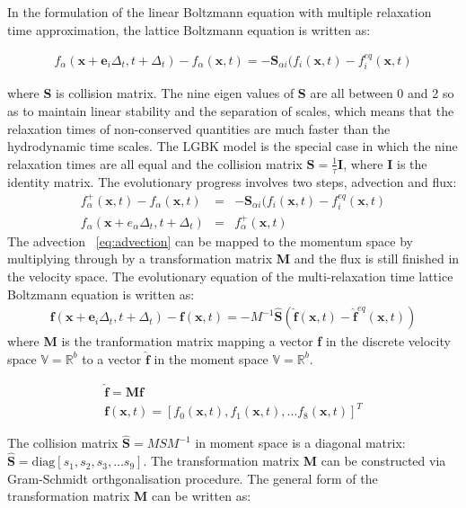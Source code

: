In the formulation of the linear Boltzmann equation with multiple relaxation time approximation, the lattice Boltzmann equation is written as:

\begin{align}
f_{\alpha}(\mathbf{x}+\mathbf{e}_i\Delta_t, t+ \Delta_t)-f_{\alpha}(\mathbf{x},t)=-\mathbf{S}_{\alpha i}(f_i(\mathbf{x},t)-f_i^{eq}(\mathbf{x},t)
\end{align}

\noindent where \textbf{S} is collision matrix. The nine eigen values of \textbf{S} are all between 0 and 2 so as to maintain linear stability and the separation of scales, which means that the relaxation times of non-conserved quantities are much faster than the hydrodynamic time scales. The LGBK model is the special case in which the nine relaxation times are all equal and the collision matrix $\mathbf{S}=\frac{1}{\tau}\mathbf{I}$, where \textbf{I} is the identity matrix. The evolutionary progress involves two steps, advection and flux:
\begin{align}
f_{\alpha}^+(\mathbf{x},t)-f_{\alpha}(\mathbf{x},t) & = & -\mathbf{S}_{\alpha i}(f_i(\mathbf{x},t)-f_i^{eq}(\mathbf{x},t) \label{eq:advection}\\
f_{\alpha}(\mathbf{x}+e_{\alpha}\Delta_t, t+\Delta_t) & = & f_{\alpha}^+(\mathbf{x},t)
\end{align}
\noindent The advection ~\cref{eq:advection} can be mapped to the momentum space by multiplying through by a transformation matrix \textbf{M} and the flux is still finished in the velocity space. The evolutionary equation of the multi-relaxation time lattice Boltzmann equation is written as:
\begin{align}
\mathbf{f}(\mathbf{x}+\mathbf{e}_i\Delta_t, t+ \Delta_t)-\mathbf{f}(\mathbf{x},t)=-M^{-1}\hat{\mathbf{S}}(\hat{\mathbf{f}}(\mathbf{x},t)-\hat{\mathbf{f}}^{eq}(\mathbf{x},t))
\end{align}
\noindent where \textbf{M} is the tranformation matrix mapping a vector \textbf{f} in the discrete velocity space $\mathds{V}=\mathds{R}^b$ to a vector $\hat{\mathbf{f}}$ in the moment space $\mathds{V}=\mathds{R}^b$. 

\begin{align}
\nonumber
\hat{\mathbf{f}}= \mathbf{M}\mathbf{f} \\ 
\nonumber
\mathbf{f}(\mathbf{x},t) =\left[f_0(\mathbf{x},t),f_1(\mathbf{x},t),\dots f_8(\mathbf{x},t)\right]^T
\end{align}

The collision matrix $\hat{\mathbf{S}} = MSM^{-1}$ in moment space is a diagonal matrix: $\hat{\mathbf{S}} =\mbox{diag} \left[ s_1, s_2, s_3,\dots s_9  \right]$. The transformation matrix \textbf{M} can be constructed via Gram-Schmidt orthgonalisation procedure. The general form of the transformation matrix \textbf{M} can be written as:

